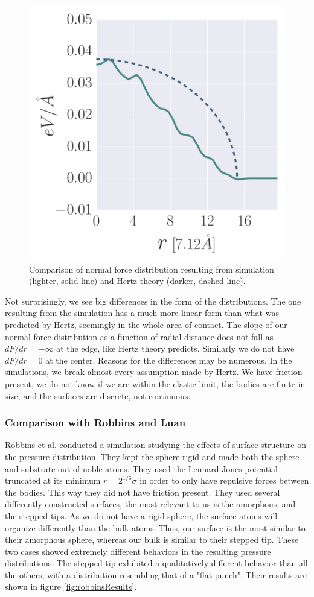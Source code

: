 \documentclass[twoside,english]{uiofysmaster}
\begin{document}
\begin{figure}[H]
\centering
\includegraphics[width=0.5\linewidth]{figures/forceDistribution/HertzCompare}
\caption{Comparison of normal force distribution resulting from simulation (lighter, solid line) and Hertz theory (darker, dashed line).}
\label{fig:HertzCompare}
\end{figure}


Not surprisingly, we see big differences in the form of the distributions. 
The one resulting from the simulation has a much more linear form than what was predicted by Hertz, seemingly in the whole area of contact.
The slope of our normal force distribution as a function of radial distance does not fall as \\$dF/dr=-\infty$ at the edge, like Hertz theory predicts.
Similarly we do not have $dF/dr=0$ at the center.
Reasons for the differences may be numerous. 
In the simulations, we break almost every assumption made by Hertz.
We have friction present, we do not know if we are within the elastic limit, the bodies are finite in size, and the surfaces are discrete, not continuous. 


\subsubsection*{Comparison with Robbins and Luan}
Robbins et al. conducted a simulation \cite{RobbinsSingleAsperity} studying the effects of surface structure on the pressure distribution.
They kept the sphere rigid and made both the sphere and substrate out of noble atoms.  
They used the Lennard-Jones potential truncated at its minimum $r=2^{1/6}\sigma$ in order to only have repulsive forces between the bodies. 
This way they did not have friction present.
They used several differently constructed surfaces, the most relevant to us is the amorphous, and the stepped tips. 
As we do not have a rigid sphere, the surface atoms will organize differently than the bulk atoms.
Thus, our surface is the most similar to their amorphous sphere, 
whereas our bulk is similar to their stepped tip. 
These two cases showed extremely different behaviors in the resulting pressure distributions.
The stepped tip exhibited a qualitatively different behavior than all the others, with a distribution resembling that of a "flat punch".
Their results are shown in figure \ref{fig:robbinsResults}.
\end{document}
